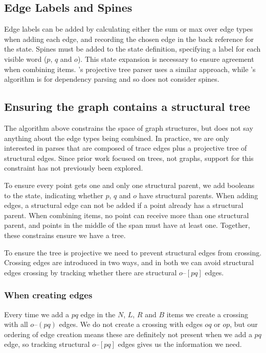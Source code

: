 \subsection{Edge Labels and Spines}\label{sec:labels}
Edge labels can be added by calculating either the sum or max over edge types when adding each edge, and recording the chosen edge in the back reference for the state.
Spines must be added to the state definition, specifying a label for each visible word ($p$, $q$ and $o$).
This state expansion is necessary to ensure agreement when combining items.
\textcite{cck}'s projective tree parser uses a similar approach, while \textcite{ec}'s algorithm is for dependency parsing and so does not consider spines.

\subsection{Ensuring the graph contains a structural tree}
The algorithm above constrains the space of graph structures, but does not say anything about the edge types being combined.
In practice, we are only interested in parses that are composed of trace edges plus a projective tree of structural edges.
Since prior work focused on trees, not graphs, support for this constraint has not previously been explored.

To ensure every point gets one and only one structural parent, we add booleans to the state, indicating whether $p$, $q$ and $o$ have structural parents.
When adding edges, a structural edge can not be added if a point already has a structural parent.
When combining items, no point can receive more than one structural parent, and points in the middle of the span must have at least one.
Together, these constrains ensure we have a tree.

To ensure the tree is projective we need to prevent structural edges from crossing.
Crossing edges are introduced in two ways, and in both we can avoid structural edges crossing by tracking whether there are structural $o$--$[pq]$ edges.

\subsubsection{When creating edges}
Every time we add a $pq$ edge in the $N$, $L$, $R$ and $B$ items we create a crossing with all $o$--$(pq)$ edges.
We do not create a crossing with edges $oq$ or $op$, but our ordering of edge creation means these are definitely not present when we add a $pq$ edge, so tracking structural $o$--$[pq]$ edges gives us the information we need.

